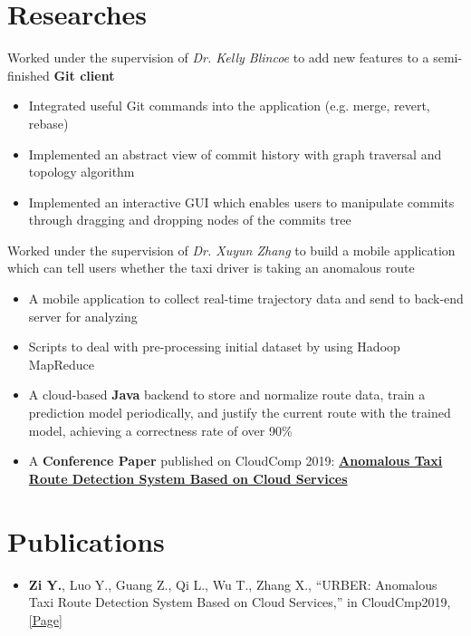\documentclass{resume}
\begin{document}
\section{Researches}
\begin{flushleft}
Worked under the supervision of \textit{Dr. Kelly Blincoe} to add new features to a semi-finished \textbf{Git client}
\begin{itemize}
    \item Integrated useful Git commands into the application (e.g. merge, revert, rebase)
    \item Implemented an abstract view of commit history with graph traversal and topology algorithm
    \item Implemented an interactive GUI which enables users to manipulate commits through dragging and \linebreak dropping nodes of the commits tree
\end{itemize}
Worked under the supervision of \textit{Dr. Xuyun Zhang} to build a mobile application which can tell users whether \linebreak the taxi driver is taking an anomalous route
\begin{itemize}
    \item A mobile application to collect real-time trajectory data and send to back-end server for analyzing
    \item Scripts to deal with pre-processing initial dataset by using Hadoop MapReduce
    \item A cloud-based \textbf{Java} backend to store and normalize route data, train a prediction model periodically, \linebreak and justify the current route with the trained model, achieving a correctness rate of over 90\%
    \item A \textbf{Conference Paper} published on CloudComp 2019: \href{https://doi.org/10.1007/978-3-030-48513-9_20}{\textbf{Anomalous Taxi Route Detection System \linebreak Based on Cloud Services}}
\end{itemize}
\end{flushleft}

\section{Publications}
\begin{itemize}
    \item \textbf{Zi Y.}, Luo Y., Guang Z., Qi L., Wu T., Zhang X.,  ``URBER: Anomalous Taxi Route Detection System Based on Cloud Services,'' in CloudCmp2019, \href{https://doi.org/10.1007/978-3-030-48513-9_20}{[Page]}
\end{itemize}
\end{document}
